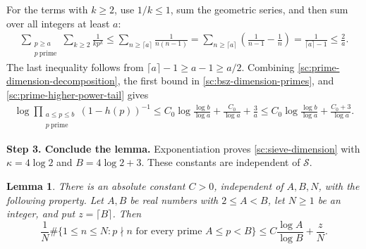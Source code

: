 \documentclass[twoside]{aomart}
\makeatletter
\theoremstyle{paperplain}
\newtheorem{lemma}[theorem]{Lemma}
\theoremstyle{paperdefinition}
\renewenvironment{proof}[1][\proofname]{\par\pushQED{\qed}%
  \normalfont\topsep6\p@\@plus3\p@\relax\trivlist
  \item[\hskip\labelsep\itshape #1\@addpunct{.}]\ignorespaces
}{\popQED\endtrivlist\@endpefalse}
\numberwithin{equation}{section}
\makeatother
\begin{document}
\begin{proof}
For the terms with $k\ge2$, use $1/k\le1$, sum the geometric
series, and then sum over all integers at least $a$:
\begin{equation}
 \begin{aligned}
 \sum_{\substack{p\ge a\\p\ \mathrm{prime}}}\sum_{k\ge2}\frac1{kp^k}
 \le\sum_{n\ge\lceil a\rceil}\frac1{n(n-1)}
 =\sum_{n\ge\lceil a\rceil}
     \left(\frac1{n-1}-\frac1n\right)
 =\frac1{\lceil a\rceil-1}\le\frac2a.
 \end{aligned}
 \label{sc:prime-higher-power-tail}
\end{equation}
The last inequality follows from $\lceil a\rceil-1\ge a-1\ge a/2$.
Combining \eqref{sc:prime-dimension-decomposition}, the first bound
in \eqref{sc:bsz-dimension-primes}, and
\eqref{sc:prime-higher-power-tail} gives
\begin{equation*}
 \begin{aligned}
 \log\prod_{\substack{a\le p\le b\\p\ \mathrm{prime}}}(1-h(p))^{-1}
 \le C_0\log\frac{\log b}{\log a}
      +\frac{C_0}{\log a}+\frac3a
 \le C_0\log\frac{\log b}{\log a}
      +\frac{C_0+3}{\log a}.
 \end{aligned}
\end{equation*}
\par
\medskip
\noindent\textbf{Step 3. Conclude the lemma.}
Exponentiation proves \eqref{sc:sieve-dimension} with
$\kappa=4\log2$ and $B=4\log2+3$. These constants are independent
of $\mathcal S$.
\end{proof}
\begin{lemma}\label{tr:rough-number}
There is an absolute constant $C>0$, independent of $A,B,N$, with
the following property. Let $A,B$ be real numbers with $2\le A<B$,
let $N\ge1$ be an integer, and put $z=\lceil B\rceil$. Then
\begin{equation}
 \frac1N\#\{1\le n\le N:p\nmid n\text{ for every prime }A\le p<B\}
 \le C\frac{\log A}{\log B}+\frac zN.
 \label{sc:bsz-rough}
\end{equation}
\end{lemma}
\end{document}
